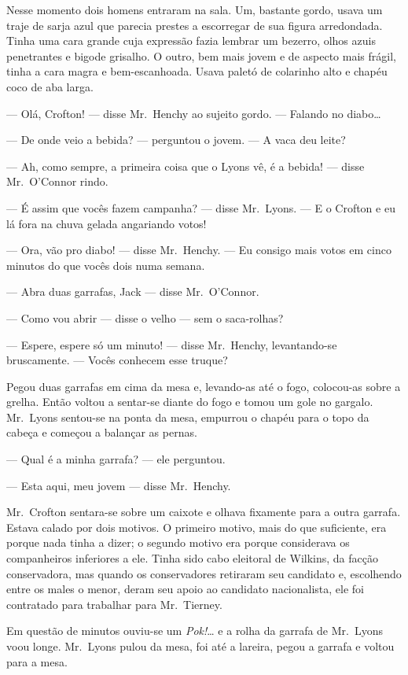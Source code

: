 Nesse momento dois homens entraram na sala.  Um, bastante gordo, usava um traje
de sarja azul que parecia prestes a escorregar de sua figura arredondada.
Tinha uma cara grande cuja expressão fazia lembrar um bezerro, olhos azuis
penetrantes e bigode grisalho.  O outro, bem mais jovem e de aspecto mais
frágil, tinha a cara magra e bem-escanhoada.  Usava paletó de colarinho alto e
chapéu coco de aba larga.

--- Olá, Crofton! --- disse Mr.~Henchy ao sujeito gordo.  --- Falando no
diabo\ldots{}

--- De onde veio a bebida? --- perguntou o jovem.  --- A vaca deu leite?

--- Ah, como sempre, a primeira coisa que o Lyons vê, é a bebida! --- disse Mr.~O’Connor rindo.

--- É assim que vocês fazem campanha? --- disse Mr.~Lyons.  --- E o Crofton e
eu lá fora na chuva gelada angariando votos!

--- Ora, vão pro diabo! --- disse Mr.~Henchy.  --- Eu consigo mais votos em
cinco minutos do que vocês dois numa semana.

--- Abra duas garrafas, Jack --- disse Mr.~O’Connor.

--- Como vou abrir --- disse o velho --- sem o saca-rolhas?

--- Espere, espere só um minuto! --- disse Mr.~Henchy, levantando-se
bruscamente. --- Vocês conhecem esse truque?

Pegou duas garrafas em cima da mesa e, levando-as até o fogo, colocou-as sobre
a grelha.  Então voltou a sentar-se diante do fogo e tomou um gole no gargalo.
Mr.~Lyons sentou-se na ponta da mesa, empurrou o chapéu para o topo da cabeça e
começou a balançar as pernas.

--- Qual é a minha garrafa? --- ele perguntou.

--- Esta aqui, meu jovem --- disse Mr.~Henchy.

Mr.~Crofton sentara-se sobre um caixote e olhava fixamente para a outra
garrafa.  Estava calado por dois motivos.  O primeiro motivo, mais do que
suficiente, era porque nada tinha a dizer; o segundo motivo era porque
considerava os companheiros inferiores a ele.  Tinha sido cabo eleitoral de
Wilkins, da facção conservadora, mas quando os conservadores retiraram seu
candidato e, escolhendo entre os males o menor, deram seu apoio ao candidato
nacionalista, ele foi contratado para trabalhar para Mr.~Tierney.

Em questão de minutos ouviu-se um \textit{Pok!}\ldots{} e a rolha da garrafa de
Mr.~Lyons voou longe.  Mr.~Lyons pulou da mesa, foi até a lareira, pegou a
garrafa e voltou para a mesa.

